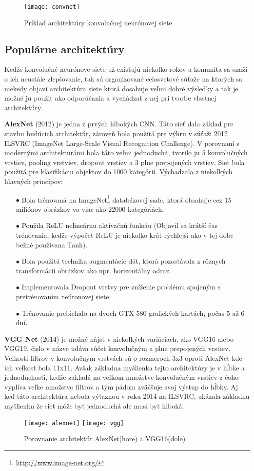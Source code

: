 \begin{figure}[H]
	\centering
	\texttt{[image: convnet]}
	\caption{Príklad architektúry konvolučnej neurónovej siete \cite{odkaz:CNNArchitecture}}
	\label{pic:CNNExample}
\end{figure}

\subsection{Populárne architektúry}
Kedže konvolučné neurónove siete už existujú niekoľko rokov a komunita sa snaží o ich neustále zlepšovanie, tak sú organizované
    celosvetové súťaže na ktorých sa niekedy objaví architektúra siete ktorá dosahuje veľmi dobré výsledky a tak je možné ju použiť ako odporúčania a
    vychádzať z nej pri tvorbe vlastnej architektúry.

\textbf{AlexNet} (2012) je jedna z prvých hlbokých CNN. Táto sieť dala základ pre stavbu budúcich architektúr, zároveň bola použitá
    pre výhru v súťaži 2012 ILSVRC (ImageNet Large-Scale Visual Recognition Challenge).
V porovnaní s modernými architekturámi bola táto veľmi jednoduchá, tvorilo ju 5 konvolučných vrstiev, pooling vrstviev, dropout vrstiev a 3 plne prepojených vrstiev.
Siet bola použitá pre klasifikáciu objektov do 1000 kategórií.
Výchadzala z niekoľkých hlavných princípov\cite{odkaz:PopularCNN}:
\begin{enumerate}
    \item[$\bullet$] Bola trénovaná na ImageNet\footnote{\url{http://www.image-net.org/}} databázovej sade, ktorá obsahuje cez 15 miliónov obrázkov vo viac ako 22000 kategóriách.
    \item[$\bullet$] Použila ReLU nelineárnu aktivačnú funkciu (Objavil sa krátší čas trénovania, kedže výpočet ReLU je niekoľko krát rýchlejši ako v tej dobe bežné používana Tanh).
    \item[$\bullet$] Bola použítá technika augmentácie dát, ktorá pozostávala z rôznych transformácií obrázkov ako npr. horizontálny odraz.
    \item[$\bullet$] Implementovala Dropout vrstvy pre zníženie problému spojeným s pretrénovaním neúronovej siete.
    \item[$\bullet$] Trénovanie prebiehalo na dvoch GTX 580 grafických kartách, počas 5 až 6 dní.
\end{enumerate}

\textbf{VGG Net} (2014) je možné nájsť v niekoľkých variáciach, ako VGG16 alebo VGG19, čislo v názve udáva súčet konvolučným a plne prepojených vrstiev.
Veľkosti filtrov v konvolučným vrstvách sú o rozmeroch 3x3 oproti AlexNet kde ich veľkosť bola 11x11.
Avšak základna myšlienka tejto architektúry je v hĺbke a jednoduchosti, kedže zakladá na veľkom množstve konvolučným vrstiev z čoho vyplíva
    veľke množstvo filtrov a tým pádom zväčšuje svoj výstup do hĺbky.
Aj keď táto architektúra nebola výťaznou v roku 2014 na ILSVRC, ukázala základnu myšlienku že sieť môže byť jednoduchá ale musí byť hlboká\cite{odkaz:PopularCNN}.

\begin{figure}[H]
    \centering
    \texttt{[image: alexnet]}
    \qquad
    \texttt{[image: vgg]}
    \caption{Porovnanie architektúr AlexNet(hore)\cite{odkaz:AlexNet} a VGG16(dole)\cite{odkaz:VGG16}}
    \label{pic:PopularCNN}
\end{figure}
